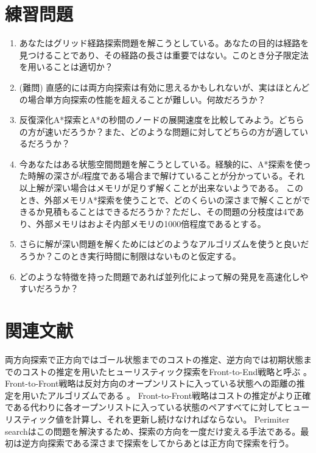 \section{練習問題}

\begin{enumerate}
	\item あなたはグリッド経路探索問題を解こうとしている。あなたの目的は経路を見つけることであり、その経路の長さは重要ではない。このとき分子限定法を用いることは適切か？
	
	\item (難問) 直感的には両方向探索は有効に思えるかもしれないが、実はほとんどの場合単方向探索の性能を超えることが難しい。何故だろうか？

	\item 反復深化A*探索とA*の秒間のノードの展開速度を比較してみよう。どちらの方が速いだろうか？また、どのような問題に対してどちらの方が適しているだろうか？

	\item 今あなたはある状態空間問題を解こうとしている。経験的に、A*探索を使った時解の深さが$d$程度である場合まで解けていることが分かっている。それ以上解が深い場合はメモリが足りず解くことが出来ないようである。
	このとき、外部メモリA*探索を使うことで、どのくらいの深さまで解くことができるか見積もることはできるだろうか？ただし、その問題の分枝度は4であり、外部メモリはおよそ内部メモリの1000倍程度であるとする。

	\item さらに解が深い問題を解くためにはどのようなアルゴリズムを使うと良いだろうか？このとき実行時間に制限はないものと仮定する。
		
	\item どのような特徴を持った問題であれば並列化によって解の発見を高速化しやすいだろうか？
\end{enumerate}

\section{関連文献}

両方向探索で正方向ではゴール状態までのコストの推定、逆方向では初期状態までのコストの推定を用いたヒューリスティック探索をFront-to-End戦略と呼ぶ \cite{pohl1971bi}。Front-to-Front戦略は反対方向のオープンリストに入っている状態への距離の推定を用いたアルゴリズムである \cite{sint1977improved}。
Front-to-Front戦略はコストの推定がより正確である代わりに各オープンリストに入っている状態のペアすべてに対してヒューリスティック値を計算し、それを更新し続けなければならない。
Perimiter searchはこの問題を解決するため、探索の方向を一度だけ変える手法である\cite{dillenburg1994perimeter,manzini1995bida}。最初は逆方向探索である深さまで探索をしてからあとは正方向で探索を行う。

